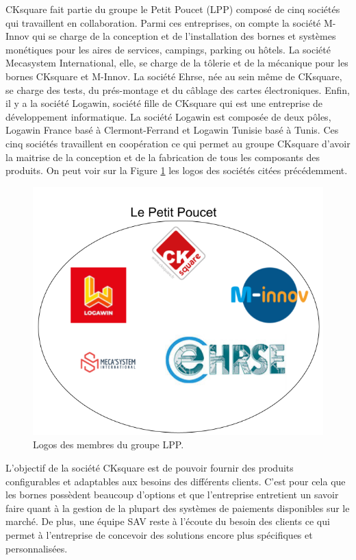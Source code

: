 \documentclass[a4paper]{article}
\begin{document}
CKsquare fait partie du groupe le Petit Poucet (LPP) composé de cinq sociétés
qui travaillent en collaboration. Parmi ces entreprises, on compte la société
M-Innov qui se charge de la conception et de l'installation des bornes et
systèmes monétiques pour les aires de services, campings, parking ou hôtels. La
société Mecasystem International, elle, se charge de la tôlerie et de la
mécanique pour les bornes CKsquare et M-Innov. La société Ehrse, née au sein
même de CKsquare, se charge des tests, du prés-montage et du câblage des cartes
électroniques. Enfin, il y a la société Logawin, société fille de CKsquare qui
est une entreprise de développement informatique. La société Logawin est
composée de deux pôles, Logawin France basé à Clermont-Ferrand et Logawin
Tunisie basé à Tunis. Ces cinq sociétés travaillent en coopération ce qui permet
au groupe CKsquare d'avoir la maitrise de la conception et de la fabrication de
tous les composants des produits. On peut voir sur la Figure \ref{lpp-logos} les
logos des sociétés citées précédemment.

\clearpage

\begin{figure}[h!]
  \begin{center}
  \includegraphics[scale=0.4]{./img/lpp-logos.png}
  \caption{Logos des membres du groupe LPP.}
    \label{lpp-logos}
  \end{center}
\end{figure}

L'objectif de la société CKsquare est de pouvoir fournir des produits
configurables et adaptables aux besoins des différents clients. C'est pour cela
que les bornes possèdent beaucoup d'options et que l'entreprise entretient un
savoir faire quant à la gestion de la plupart des systèmes de paiements
disponibles sur le marché. De plus, une équipe SAV reste à l'écoute du besoin
des clients ce qui permet à l'entreprise de concevoir des solutions encore plus
spécifiques et personnalisées.
\end{document}
